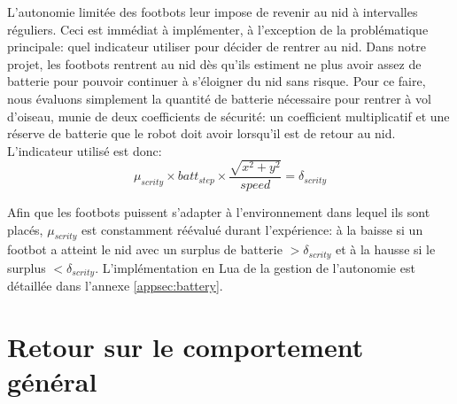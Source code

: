 L'autonomie limitée des footbots leur impose de revenir au nid à intervalles réguliers. Ceci est immédiat à implémenter, à l'exception de la problématique principale: quel indicateur utiliser pour décider de rentrer au nid. Dans notre projet, les footbots rentrent au nid dès qu'ils estiment ne plus avoir assez de batterie pour pouvoir continuer à s'éloigner du nid sans risque. Pour ce faire, nous évaluons simplement la quantité de batterie nécessaire pour rentrer à vol d'oiseau, munie de deux coefficients de sécurité: un coefficient multiplicatif et une réserve de batterie que le robot doit avoir lorsqu'il est de retour au nid. L'indicateur utilisé est donc:
\[
  \mu_{scrity} \times batt_{step} \times \frac{\sqrt{x^2+y^2}}{speed}=\delta_{scrity}
\]

Afin que les footbots puissent s'adapter à l'environnement dans lequel ils sont placés, $\mu_{scrity}$ est constamment réévalué durant l'expérience: à la baisse si un footbot a atteint le nid avec un surplus de batterie $>\delta_{scrity}$ et à la hausse si le surplus $<\delta_{scrity}$.
L'implémentation en Lua de la gestion de l'autonomie est détaillée dans l'annexe \ref{appsec:battery}.



\section{Retour sur le comportement général\label{sec:tree}}

